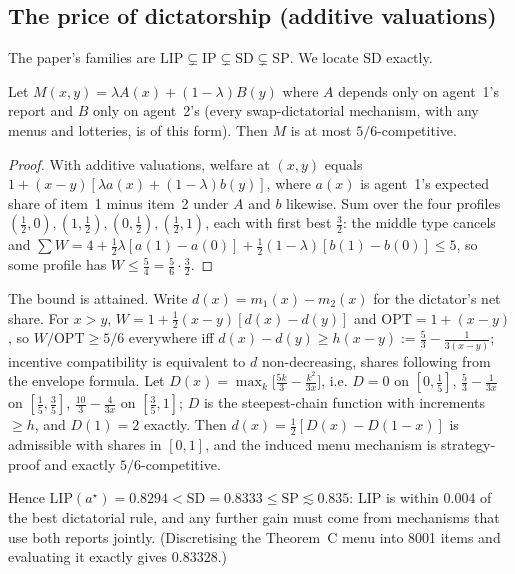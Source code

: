 \subsection{The price of dictatorship (additive valuations)}

The paper's families are $\mathrm{LIP}\subsetneq\mathrm{IP}\subsetneq\mathrm{SD}\subsetneq\mathrm{SP}$.
We locate SD exactly.

\begin{theorem}[A]
Let $M(x,y)=\lambda A(x)+(1-\lambda)B(y)$ where $A$ depends only on agent~1's report and $B$ only on
agent~2's (every swap-dictatorial mechanism, with any menus and lotteries, is of this form). Then $M$ is at
most $5/6$-competitive.
\end{theorem}
\begin{proof}
With additive valuations, welfare at $(x,y)$ equals $1+(x-y)[\lambda a(x)+(1-\lambda)b(y)]$, where
$a(x)$ is agent~1's expected share of item~1 minus item~2 under $A$ and $b$ likewise. Sum over the four
profiles $(\tfrac12,0),(1,\tfrac12),(0,\tfrac12),(\tfrac12,1)$, each with first best $\tfrac32$: the middle
type cancels and $\sum W=4+\tfrac12\lambda[a(1)-a(0)]+\tfrac12(1-\lambda)[b(1)-b(0)]\le5$, so some profile
has $W\le\tfrac54=\tfrac56\cdot\tfrac32$.
\end{proof}

\begin{theorem}[C]
The bound is attained. Write $d(x)=m_1(x)-m_2(x)$ for the dictator's net share. For $x>y$,
$W=1+\tfrac12(x-y)[d(x)-d(y)]$ and $\mathrm{OPT}=1+(x-y)$, so $W/\mathrm{OPT}\ge5/6$ everywhere iff
$d(x)-d(y)\ge h(x-y):=\tfrac53-\tfrac{1}{3(x-y)}$; incentive compatibility is equivalent to $d$
non-decreasing, shares following from the envelope formula. Let
$D(x)=\max_k\big[\tfrac{5k}{3}-\tfrac{k^2}{3x}\big]$, i.e. $D=0$ on $[0,\tfrac15]$, $\tfrac53-\tfrac1{3x}$ on
$[\tfrac15,\tfrac35]$, $\tfrac{10}3-\tfrac4{3x}$ on $[\tfrac35,1]$; $D$ is the steepest-chain function with
increments $\ge h$, and $D(1)=2$ exactly. Then $d(x)=\tfrac12[D(x)-D(1-x)]$ is admissible with shares in
$[0,1]$, and the induced menu mechanism is strategy-proof and exactly $5/6$-competitive.
\end{theorem}

Hence $\mathrm{LIP}(a^\star)=0.8294<\mathrm{SD}=0.8333\le\mathrm{SP}\lesssim0.835$: LIP is within $0.004$ of the
best dictatorial rule, and any further gain must come from mechanisms that use both reports jointly.
(Discretising the Theorem~C menu into 8001 items and evaluating it exactly gives $0.83328$.)

